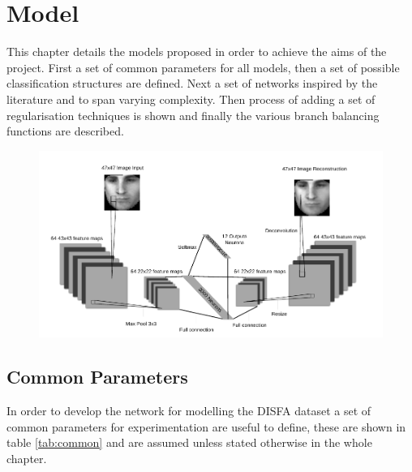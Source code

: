 \chapter{Model} \label{sec:model}

  This chapter details the models proposed in order to achieve the aims of the project.
  First a set of common parameters for all models, then a set of possible
  classification structures are defined. Next a set of networks inspired
  by the literature and to span varying complexity.
  Then process of adding a set of regularisation techniques is shown and finally the
  various branch balancing functions are described.

  \begin{figure}[h!]
   \centering
   \includegraphics[width=\textwidth]{illustrations/aec_network.pdf}
   \label{fig:netII}
  \end{figure}

  \section{Common Parameters}
    In order to develop the network for modelling the DISFA dataset a set of common
    parameters for experimentation are useful to define, these are shown in table \ref{tab:common}
    and are assumed unless stated otherwise in the whole chapter.

